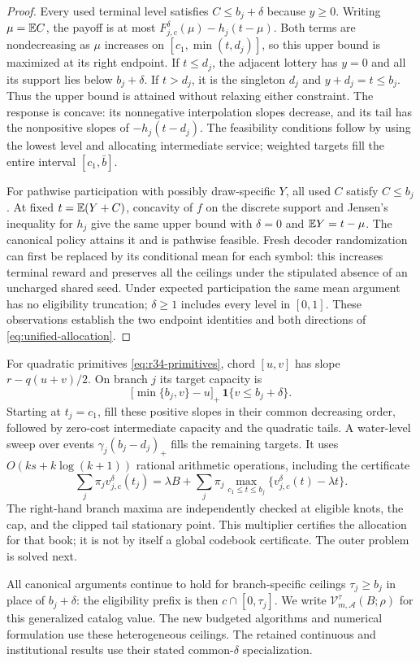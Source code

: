 \begin{proof}
Every used terminal level satisfies $C\leq b_j+\delta$ because $y\geq0$. Writing $\mu=\mathbb E C$, the payoff is at most $F_{j,c}^\delta(\mu)-h_j(t-\mu)$. Both terms are nondecreasing as $\mu$ increases on $[c_1,\min(t,d_j)]$, so this upper bound is maximized at its right endpoint. If $t\leq d_j$, the adjacent lottery has $y=0$ and all its support lies below $b_j+\delta$. If $t>d_j$, it is the singleton $d_j$ and $y+d_j=t\leq b_j$. Thus the upper bound is attained without relaxing either constraint. The response is concave: its nonnegative interpolation slopes decrease, and its tail has the nonpositive slopes of $-h_j(t-d_j)$. The feasibility conditions follow by using the lowest level and allocating intermediate service; weighted targets fill the entire interval $[c_1,\bar b]$.

For pathwise participation with possibly draw-specific $Y$, all used $C$ satisfy $C\leq b_j$. At fixed $t=\mathbb E(Y+C)$, concavity of $f$ on the discrete support and Jensen's inequality for $h_j$ give the same upper bound with $\delta=0$ and $\mathbb E Y=t-\mu$. The canonical policy attains it and is pathwise feasible. Fresh decoder randomization can first be replaced by its conditional mean for each symbol: this increases terminal reward and preserves all the ceilings under the stipulated absence of an uncharged shared seed. Under expected participation the same mean argument has no eligibility truncation; $\delta\geq1$ includes every level in $[0,1]$. These observations establish the two endpoint identities and both directions of \eqref{eq:unified-allocation}.
\end{proof}

For quadratic primitives \eqref{eq:r34-primitives}, chord $[u,v]$ has slope $r-q(u+v)/2$. On branch $j$ its target capacity is
\[
 \bigl[\min\{b_j,v\}-u\bigr]_+\,\mathbf 1\{v\leq b_j+\delta\}.
\]
Starting at $t_j=c_1$, fill these positive slopes in their common decreasing order, followed by zero-cost intermediate capacity and the quadratic tails. A water-level sweep over events $\gamma_j(b_j-d_j)_+$ fills the remaining targets. It uses $O(ks+k\log(k+1))$ rational arithmetic operations, including the certificate
\begin{equation}\label{eq:prefix-dual}
 \sum_j\pi_jv_{j,c}^\delta(t_j)
 =\lambda B+\sum_j\pi_j\max_{c_1\leq t\leq b_j}
       \{v_{j,c}^\delta(t)-\lambda t\}.
\end{equation}
The right-hand branch maxima are independently checked at eligible knots, the cap, and the clipped tail stationary point. This multiplier certifies the allocation for that book; it is not by itself a global codebook certificate. The outer problem is solved next.


All canonical arguments continue to hold for branch-specific ceilings $\tau_j\geq b_j$ in place of $b_j+\delta$: the eligibility prefix is then $c\cap[0,\tau_j]$. We write $\mathcal V_{m,\mathcal A}^{\tau}(B;\rho)$ for this generalized catalog value. The new budgeted algorithms and numerical formulation use these heterogeneous ceilings. The retained continuous and institutional results use their stated common-$\delta$ specialization.
